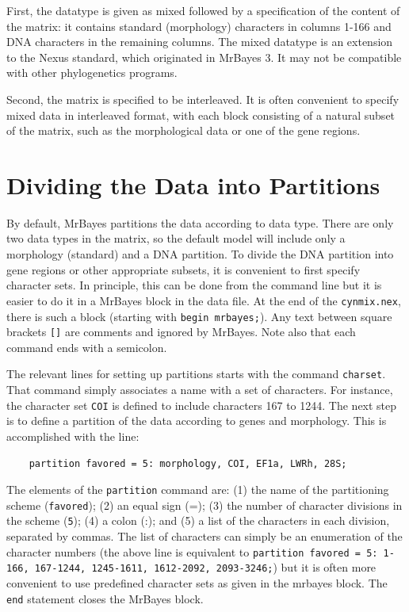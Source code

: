 \documentclass[12pt]{book}
\begin{document}
First, the datatype is given as mixed followed by a specification of the content of the matrix: it
contains standard (morphology) characters in columns 1-166 and DNA characters in the remaining
columns. The mixed datatype is an extension to the Nexus standard, which originated in MrBayes 3.
It may not be compatible with other phylogenetics programs.

Second, the matrix is specified to be interleaved. It is often convenient to specify mixed data in
interleaved format, with each block consisting of a natural subset of the matrix, such as the
morphological data or one of the gene regions.

\section{Dividing the Data into Partitions}

By default, MrBayes partitions the data according to data type. There are only two data types in
the matrix, so the default model will include only a morphology (standard) and a DNA partition. To
divide the DNA partition into gene regions or other appropriate subsets, it is convenient to first
specify character sets.  In principle, this can be done from the command line but it is easier to
do it in a MrBayes block in the data file. At the end of the \texttt{cynmix.nex}, there is such a
block (starting with \texttt{begin mrbayes;}).  Any text between square brackets \texttt{[]} are
comments and ignored by MrBayes.  Note also that each command ends with a semicolon.

The relevant lines for setting up partitions starts with the command \texttt{charset}. That command
simply associates a name with a set of characters. For instance, the character set \texttt{COI} is
defined to include characters 167 to 1244. The next step is to define a partition of the data
according to genes and morphology. This is accomplished with the line:

\begin{singlespacing}
\begin{verbatim}
    partition favored = 5: morphology, COI, EF1a, LWRh, 28S;
\end{verbatim}
\end{singlespacing}

The elements of the \texttt{partition} command are: (1) the name of the partitioning scheme
(\texttt{favored}); (2) an equal sign (=); (3) the number of character divisions in the scheme
(\texttt{5}); (4) a colon (:); and (5) a list of the characters in each division, separated by
commas. The list of characters can simply be an enumeration of the character numbers (the above
line is equivalent to \texttt{partition favored = 5: 1-166, 167-1244, 1245-1611, 1612-2092,
2093-3246;}) but it is often more convenient to use predefined character sets as given in the
mrbayes block.  The \texttt{end} statement closes the MrBayes block.
\end{document}
